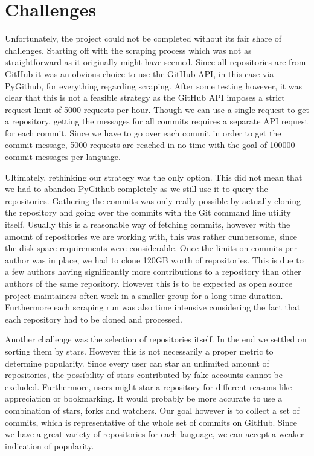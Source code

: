 \section{Challenges}
\label{sec:challenges}

Unfortunately, the project could not be completed without its fair share of
challenges. Starting off with the scraping process which was not as
straightforward as it originally might have seemed. Since all repositories are from
GitHub it was an obvious choice to use the GitHub API, in this case via PyGithub,
for everything regarding scraping. After some testing however, it was clear that
this is not a feasible strategy as the GitHub API imposes a strict request
limit of 5000 requests per hour. Though we can use a single request to get a
repository, getting the messages for all commits requires a separate API
request for each commit. Since we have to go over each commit in
order to get the commit message, 5000 requests are reached in no time with the
goal of 100000 commit messages per language.

Ultimately, rethinking our strategy was the only option. This did not mean that
we had to abandon PyGithub completely as we still use it to query the
repositories. Gathering the commits was only really possible by actually
cloning the repository and going over the commits with the Git command line utility
itself. Usually this is a reasonable way of fetching commits, however
with the amount of repositories we are working with, this was rather cumbersome,
since the disk space requirements were considerable. Once the limits on commits per
author was in place, we had to clone 120GB worth of repositories. This is due to a few
authors having significantly more contributions to a repository than other authors of the
same repository. However this is to be expected as open source project
maintainers often work in a smaller group for a long time duration. Furthermore
each scraping run was also time intensive considering the fact that each
repository had to be cloned and processed.

Another challenge was the selection of repositories itself. In the end we settled
on sorting them by stars. However this is not necessarily a proper metric to
determine popularity. Since every user can star an unlimited amount of
repositories, the possibility of stars contributed by fake accounts cannot be
excluded. Furthermore, users might star a repository for different reasons like
appreciation or bookmarking. It would probably be more accurate to use a
combination of stars, forks and watchers. Our goal however is to collect a set
of commits, which is representative of the whole set of commits on GitHub.
Since we have a great variety of repositories for each language, we can
accept a weaker indication of popularity.
